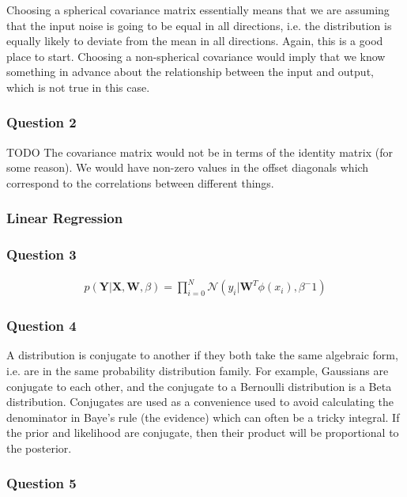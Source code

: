 \documentclass[10pt, a4paper, twocolumn]{article} %
\begin{document}
Choosing a spherical covariance matrix essentially means that we are assuming that the input noise is going to be equal in all directions, i.e. the distribution is equally likely to deviate from the mean in all directions. Again, this is a good place to start. Choosing a non-spherical covariance would imply that we know something in advance about the relationship between the input and output, which is not true in this case.

\subsubsection*{Question 2}

TODO
The covariance matrix would not be in terms of the identity matrix (for some reason). We would have non-zero values in the offset diagonals which correspond to the correlations between different things.

\subsubsection{Linear Regression}

\subsubsection*{Question 3}

\begin{align}
  p(\mathbf{Y} | \mathbf{X}, \mathbf{W}, \beta) = \prod_{i=0}^N \mathcal{N} (y_i | \mathbf{W}^T\phi(x_i), \beta^-1)
\end{align}

\subsubsection*{Question 4}

A distribution is conjugate to another if they both take the same algebraic form, i.e. are in the same probability distribution family. For example, Gaussians are conjugate to each other, and the conjugate to a Bernoulli distribution is a Beta distribution. Conjugates are used as a convenience used to avoid calculating the denominator in Baye's rule (the evidence) which can often be a tricky integral. If the prior and likelihood are conjugate, then their product will be proportional to the posterior.

\subsubsection*{Question 5}
\end{document}
